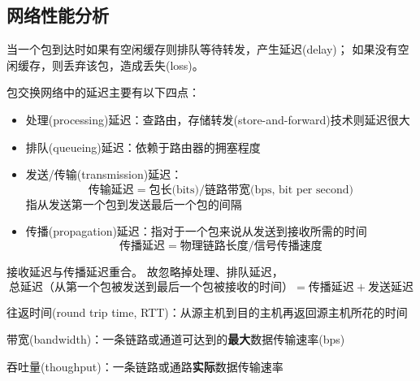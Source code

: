 \subsection{网络性能分析}
当一个包到达时如果有空闲缓存则排队等待转发，产生延迟(delay)；
如果没有空闲缓存，则丢弃该包，造成丢失(loss)。

包交换网络中的延迟主要有以下四点：
\begin{itemize}
	\item 处理(processing)延迟：查路由，存储转发(store-and-forward)技术则延迟很大
	\item 排队(queueing)延迟：依赖于路由器的拥塞程度
	\item 发送/传输(transmission)延迟：\[\text{传输延迟}=\text{包长(bits)}/\text{链路带宽(bps, bit per second)}\]
	指从发送第一个包到发送最后一个包的间隔
	\item 传播(propagation)延迟：指对于一个包来说从发送到接收所需的时间
	\[\text{传播延迟}=\text{物理链路长度}/\text{信号传播速度}\]
\end{itemize}

接收延迟与传播延迟重合。
故忽略掉处理、排队延迟，
\[\text{总延迟（从第一个包被发送到最后一个包被接收的时间）}=\text{传播延迟}+\text{发送延迟}\]

\par 往返时间(round trip time, RTT)：从源主机到目的主机再返回源主机所花的时间
\par 带宽(bandwidth)：一条链路或通道可达到的\textbf{最大}数据传输速率(bps)
\par 吞吐量(thoughput)：一条链路或通路\textbf{实际}数据传输速率

